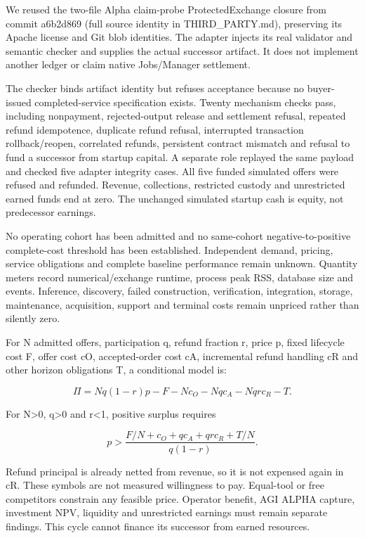 \documentclass[
  10pt,
]{article}
\begin{document}
We reused the two-file Alpha claim-probe ProtectedExchange closure from
commit a6b2d869 (full source identity in THIRD\_PARTY.md), preserving
its Apache license and Git blob identities. The adapter injects its real
validator and semantic checker and supplies the actual successor
artifact. It does not implement another ledger or claim native
Jobs/Manager settlement.

The checker binds artifact identity but refuses acceptance because no
buyer-issued completed-service specification exists. Twenty mechanism
checks pass, including nonpayment, rejected-output release and
settlement refusal, repeated refund idempotence, duplicate refund
refusal, interrupted transaction rollback/reopen, correlated refunds,
persistent contract mismatch and refusal to fund a successor from
startup capital. A separate role replayed the same payload and checked
five adapter integrity cases. All five funded simulated offers were
refused and refunded. Revenue, collections, restricted custody and
unrestricted earned funds end at zero. The unchanged simulated startup
cash is equity, not predecessor earnings.

No operating cohort has been admitted and no same-cohort
negative-to-positive complete-cost threshold has been established.
Independent demand, pricing, service obligations and complete baseline
performance remain unknown. Quantity meters record numerical/exchange
runtime, process peak RSS, database size and events. Inference,
discovery, failed construction, verification, integration, storage,
maintenance, acquisition, support and terminal costs remain unpriced
rather than silently zero.

For N admitted offers, participation q, refund fraction r, price p,
fixed lifecycle cost F, offer cost cO, accepted-order cost cA,
incremental refund handling cR and other horizon obligations T, a
conditional model is:

\[
\Pi=Nq(1-r)p-F-Nc_O-Nqc_A-Nqr c_R-T.
\]

For N\textgreater0, q\textgreater0 and r\textless1, positive surplus
requires

\[
p>\frac{F/N+c_O+q c_A+qr c_R+T/N}{q(1-r)}.
\]

Refund principal is already netted from revenue, so it is not expensed
again in cR. These symbols are not measured willingness to pay.
Equal-tool or free competitors constrain any feasible price. Operator
benefit, AGI ALPHA capture, investment NPV, liquidity and unrestricted
earnings must remain separate findings. This cycle cannot finance its
successor from earned resources.
\end{document}
